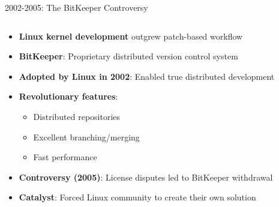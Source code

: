 \documentclass{beamer}
\begin{document}
\begin{frame}{2002-2005: The BitKeeper Controversy}
\begin{columns}
    \begin{column}{0.6\textwidth}
        \begin{itemize}
            \item \textbf{Linux kernel development} outgrew patch-based workflow
            \item \textbf{BitKeeper}: Proprietary distributed version control system
            \item \textbf{Adopted by Linux in 2002}: Enabled true distributed development
            \item \textbf{Revolutionary features}:
                \begin{itemize}
                    \item Distributed repositories
                    \item Excellent branching/merging
                    \item Fast performance
                \end{itemize}
            \item \textbf{Controversy (2005)}: License disputes led to BitKeeper withdrawal
            \item \textbf{Catalyst}: Forced Linux community to create their own solution
        \end{itemize}
    \end{column}
    \begin{column}{0.4\textwidth}
    \end{column}
\end{columns}
\end{frame}
\end{document}
